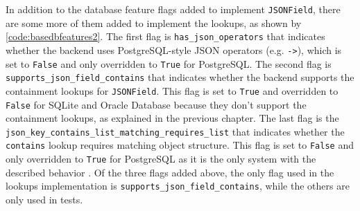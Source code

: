 In addition to the database feature flags added to implement \verb|JSONField|,
there are some more of them added to implement the lookups, as shown by
\autoref{code:basedbfeatures2}. The first flag is \verb|has_json_operators|
that indicates whether the backend uses PostgreSQL-style JSON operators (e.g.
\verb|->|), which is set to \verb|False| and only overridden to \verb|True| for
PostgreSQL. The second flag is \verb|supports_json_field_contains| that
indicates whether the backend supports the containment lookups for
\verb|JSONField|. This flag is set to \verb|True| and overridden to
\verb|False| for SQLite and Oracle Database because they don't support the
containment lookups, as explained in the previous chapter. The last flag is the
\verb|json_key_contains_list_matching_requires_list| that indicates whether the
\verb|contains| lookup requires matching object structure. This flag is set
to \verb|False| and only overridden to \verb|True| for PostgreSQL as it is the
only system with the described behavior \cite{postgres:json}. Of the three
flags added above, the only flag used in the lookups implementation is
\verb|supports_json_field_contains|, while the others are only used in tests.
